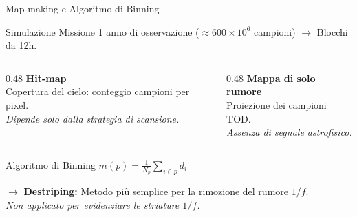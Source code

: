 \documentclass[10pt, aspectratio=169, handout]{beamer}
\begin{document}
\begin{frame}{Map-making e Algoritmo di Binning}

  \begin{block}{Simulazione Missione}
    \footnotesize
    1 anno di osservazione ($\approx 600 \times 10^6$ campioni) $\rightarrow$ Blocchi da 12h.
  \end{block}

  \vspace{0.3cm}

  \begin{columns}[T]
    \begin{column}{0.48\textwidth}
      \centering
      \small \textbf{Hit-map} \\
      \scriptsize Copertura del cielo: conteggio campioni per pixel. \\
      \textit{Dipende solo dalla strategia di scansione.}
    \end{column}
    \begin{column}{0.48\textwidth}
      \centering
      \small \textbf{Mappa di solo rumore} \\
      \scriptsize Proiezione dei campioni TOD. \\
      \textit{Assenza di segnale astrofisico.}
    \end{column}
  \end{columns}

  \vspace{0.4cm}

  \begin{exampleblock}{Algoritmo di Binning}
    \centering
    \vspace{0.1cm}
    $\displaystyle m(p) = \frac{1}{N_p} \sum_{i \in p} d_i$
    \vspace{0.1cm}
  \end{exampleblock}

  \vspace{0.4cm}

  \centering
  \footnotesize 
  $\rightarrow$ \textbf{Destriping:} Metodo più semplice per la rimozione del rumore $1/f$. \\
  \vspace{0.1cm}
  \scriptsize \textit{Non applicato per evidenziare le striature $1/f$.}

\end{frame}
\end{document}
